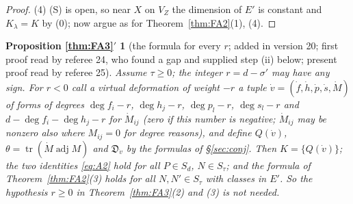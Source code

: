 \documentclass[11pt]{article}
\numberwithin{equation}{section}
\newtheorem*{propallr}{Proposition \ref{thm:FA3}$'$}
\theoremstyle{remark}
\newcommand{\VZ}{V_Z}
\begin{document}
\begin{proof}
(4) (S) is open, so near $X$ on $\VZ$ the dimension of $E'$ is constant and $K_\lambda=K$ by (0); now argue as
for Theorem~\ref{thm:FA2}(1), (4).
\end{proof}

\begin{propallr}[the formula for every $r$; added in version 20; first proof read by referee 24, who found a
gap and supplied step (ii) below; present proof read by referee 25]
Assume $\tau\ge0$; the integer $r=d-\sigma'$ may have any sign. For $r<0$ call a \emph{virtual deformation of weight
$-r$} a tuple $\dot v=(\dot f,\dot h,\dot p,\dot s,\dot M)$ of forms of degrees $\deg f_i-r$, $\deg h_j-r$,
$\deg p_l-r$, $\deg s_l-r$ and $d-\deg f_i-\deg h_j-r$ for $\dot M_{ij}$ (zero if this number is negative; $\dot M_{ij}$
may be nonzero also where $M_{ij}=0$ for degree reasons), and define $Q(\dot v)$,
$\theta=\operatorname{tr}(\dot M\operatorname{adj}M)$ and $\mathfrak D_{\dot v}$ by the formulas of \S\ref{sec:conj}. Then
$K=\{Q(\dot v)\}$; the two identities \eqref{eq:A2} hold for all $P\in S_d$, $N\in S_\tau$; and the formula of
Theorem~\ref{thm:FA2}\textup{(3)} holds for all $N,N'\in S_\tau$ with classes in $E'$. So the hypothesis $r\ge0$ in
Theorem~\ref{thm:FA3}\textup{(2)} and \textup{(3)} is not needed.
\end{propallr}
\end{document}

